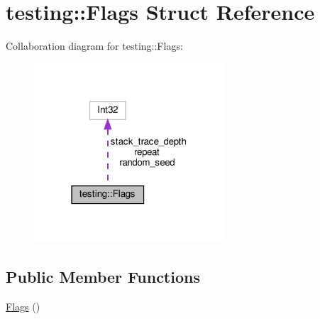 \hypertarget{structtesting_1_1_flags}{}\section{testing\+:\+:Flags Struct Reference}
\label{structtesting_1_1_flags}


Collaboration diagram for testing\+:\+:Flags\+:
\nopagebreak
\begin{figure}[H]
\begin{center}
\leavevmode
\includegraphics[width=202pt]{structtesting_1_1_flags__coll__graph}
\end{center}
\end{figure}
\subsection*{Public Member Functions}
\begin{DoxyCompactItemize}
\item 
\hyperlink{structtesting_1_1_flags_a41dc8942bec08ebc7f74dee545e6ad7e}{Flags} ()
\end{DoxyCompactItemize}
